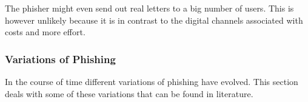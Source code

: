 \begin{description}[leftmargin=0cm]
	\item[Physical letters] The phisher might even send out real letters to a big number of users. This is however unlikely because it is in contrast to the digital channels associated with costs and more effort.

\end{description}

\subsubsection{Variations of Phishing}
In the course of time different variations of phishing have evolved.
 This section deals with some of these variations that can be found in literature.

\label{s:phishing_variations}

